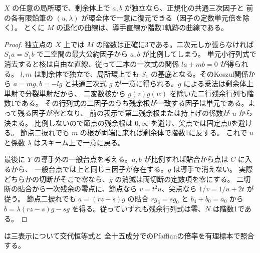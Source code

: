 \begin{proposition}\label{prop:singular-independent-common-cubic}
$X$ の任意の局所環で、剰余体上で $a,b$ が独立なら、正規化の共通三次因子と
前の各有限鉛筆の $(u,\lambda)$ が環全体で一意に復元できる（因子の定数単元倍を除く）。
とくに $M$ の退化の曲線は、導手直線か階数1軌跡の曲線である。
\end{proposition}
\begin{proof}
独立点の $X$ 上では $M$ の階数は正確に3である。二次元しか張らなければ
$S_1a=S_1b$ で二空間の最大公約因子から $a,b$ が比例してしまう。
単元小行列式で消去すると核は自由な直線、従って二本の一次式の関係 $l a+m b=0$ が得られる。
$l,m$ は剰余体で独立で、局所環上でも $S_1$ の基底となる。そのKoszul関係から
$a=mg,b=-lg$ と共通三次式 $g$ が一意に得られる。$g$ による乗法は剰余体上単射で分裂単射だから、
二変数核から $g(z)g(w)$ を除いた二行残余行列も階数1である。
その行列式の二因子のうち残余根が一致する因子は単元である。よって残る因子が零となり、
前の表示で第二残余根または持上げの係数が $u$ から決まる。
比例しないので節点の残余根は $0,\infty$ を避け、尖点では固定点0を避ける。
節点二捩れでも $m$ の根が両端に来れば剰余体で階数1に反する。
これで $u$ と係数 $\lambda$ はスキーム上で一意に戻る。

最後に $Y$ の導手外の一般台点を考える。$a,b$ が比例すれば貼合から点は $C$ に入るから、
一般台点では上と同じ三因子が存在する。$g$ は導手で消えない。
実際どちらかの切断がそこで零なら、$g$ の消滅は両切断の定数項を零にする。
二切断の貼合から一次残余の零点に、節点なら $v=t^2u$、尖点なら $1/v=1/u+2t$ が従う。
節点二捩れでも $a=(rz-s)g$ の貼合 $r g_3=s g_0$ と $b_4+b_0=a_0$ から
$b=\lambda(rz-s)g-sg$ を得る。従っていずれも残余行列式は零、$N$ は階数1である。
\end{proof}

 は三表示について交代恒等式と
全十五成分でのPfaffianの倍率を有理標本で照合する。
